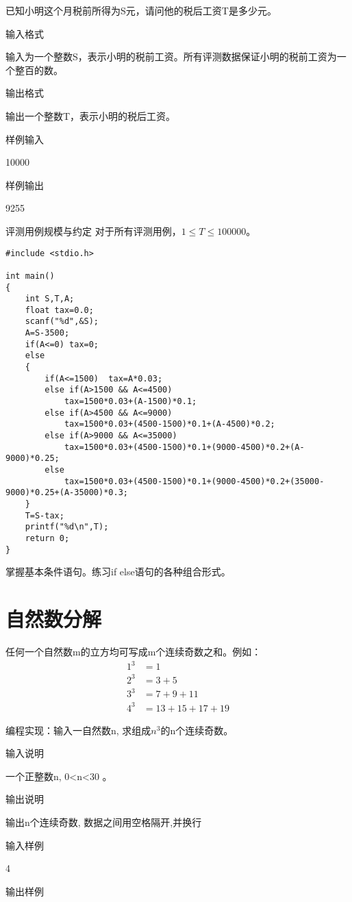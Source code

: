 已知小明这个月税前所得为S元，请问他的税后工资T是多少元。

输入格式

输入为一个整数S，表示小明的税前工资。所有评测数据保证小明的税前工资为一个整百的数。

输出格式

输出一个整数T，表示小明的税后工资。

样例输入

10000

样例输出

9255

评测用例规模与约定
对于所有评测用例，$1\le T\le 100000$。

\begin{lstlisting}
#include <stdio.h>

int main()
{
	int S,T,A;
	float tax=0.0;
	scanf("%d",&S);
	A=S-3500;
	if(A<=0) tax=0;
	else
	{
		if(A<=1500)  tax=A*0.03;	
		else if(A>1500 && A<=4500) 
			tax=1500*0.03+(A-1500)*0.1;
		else if(A>4500 && A<=9000) 
			tax=1500*0.03+(4500-1500)*0.1+(A-4500)*0.2;
		else if(A>9000 && A<=35000) 
			tax=1500*0.03+(4500-1500)*0.1+(9000-4500)*0.2+(A-9000)*0.25;
		else 
			tax=1500*0.03+(4500-1500)*0.1+(9000-4500)*0.2+(35000-9000)*0.25+(A-35000)*0.3;
	} 
	T=S-tax;
	printf("%d\n",T);
	return 0;
} 
\end{lstlisting}

\begin{note}[要点]
	掌握基本条件语句。练习if else语句的各种组合形式。
\end{note}


\section{自然数分解}
任何一个自然数m的立方均可写成m个连续奇数之和。例如：
\begin{align*}
1^3 &=1\\
2^3 &=3+5\\
3^3 &=7+9+11\\
4^3 &=13+15+17+19
\end{align*}

编程实现：输入一自然数n, 求组成$n^3$的n个连续奇数。

输入说明

一个正整数n, 0<n<30 。

输出说明

输出n个连续奇数, 数据之间用空格隔开,并换行

输入样例

4

输出样例

